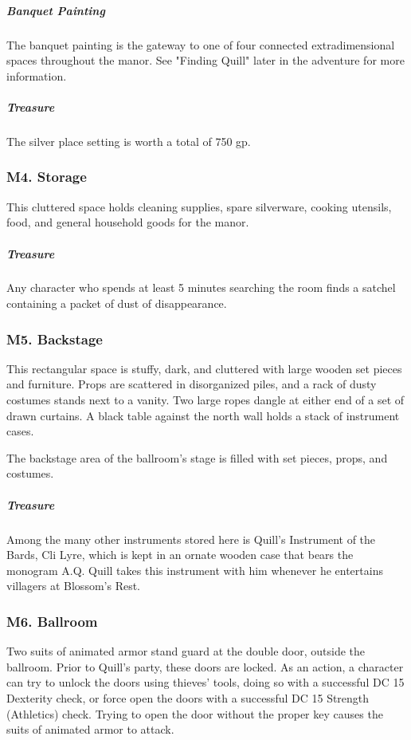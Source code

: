 \documentclass[10pt,a4paper,twoside,bg=print,twocolumn,openany,nodeprecatedcode]{dndbook}
\begin{document}
\subparagraph{Banquet Painting}
The banquet painting is the gateway to one of four connected extradimensional spaces throughout the manor. See "Finding Quill" later in the adventure for more information.

\subparagraph{Treasure}
The silver place setting is worth a total of 750 gp.

\subsubsection{M4. Storage}
This cluttered space holds cleaning supplies, spare silverware, cooking utensils, food, and general household goods for the manor.

\subparagraph{Treasure}
Any character who spends at least 5 minutes searching the room finds a satchel containing a packet of dust of disappearance.

\subsubsection{M5. Backstage}
\begin{DndReadAloud}{}
This rectangular space is stuffy, dark, and cluttered with large wooden set pieces and furniture. Props are scattered in disorganized piles, and a rack of dusty costumes stands next to a vanity. Two large ropes dangle at either end of a set of drawn curtains. A black table against the north wall holds a stack of instrument cases.

\end{DndReadAloud}

The backstage area of the ballroom's stage is filled with set pieces, props, and costumes.

\subparagraph{Treasure}
Among the many other instruments stored here is Quill's Instrument of the Bards, Cli Lyre, which is kept in an ornate wooden case that bears the monogram A.Q. Quill takes this instrument with him whenever he entertains villagers at Blossom's Rest.

\subsubsection{M6. Ballroom}
Two suits of animated armor stand guard at the double door, outside the ballroom. Prior to Quill's party, these doors are locked. As an action, a character can try to unlock the doors using thieves' tools, doing so with a successful DC 15 Dexterity check, or force open the doors with a successful DC 15 Strength (Athletics) check. Trying to open the door without the proper key causes the suits of animated armor to attack.
\end{document}
